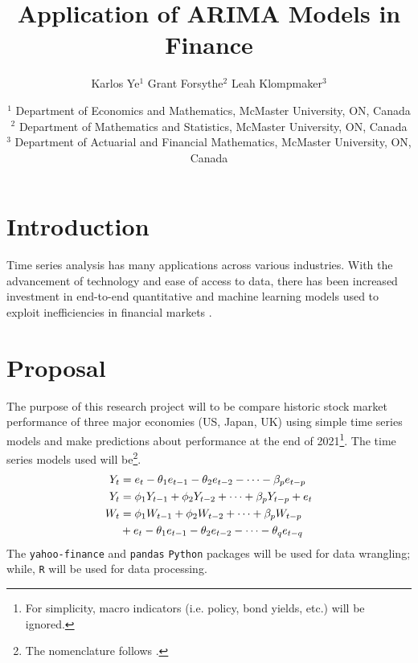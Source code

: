 \documentclass[12pt, centerh1]{article}
\title{Application of ARIMA Models in Finance}
\author{\qquad Karlos Ye$^{1}$ \qquad Grant Forsythe$^{2}$ \qquad Leah Klompmaker$^{3}$}
\date{
{\footnotesize $^1$ Department of Economics and Mathematics, McMaster University, ON, Canada\\[-6pt]
               $^2$ Department of Mathematics and Statistics, McMaster University, ON, Canada\\[-6pt]
               $^3$ Department of Actuarial and Financial Mathematics, McMaster University, ON, Canada\\[-6pt]}
}
\begin{document}
\clearpage\maketitle
\setcounter{page}{1}
\section{Introduction}
Time series analysis has many applications across various industries. With the advancement of technology and ease of access to data, there has been increased investment in end-to-end quantitative and machine learning models used to exploit inefficiencies in financial markets \citep{coqueret2021machine}. 
\section{Proposal}
The purpose of this research project will to be compare historic stock market performance of three major economies (US, Japan, UK) using simple time series models and make predictions about performance at the end of 2021\footnote{For simplicity, macro indicators (i.e. policy, bond yields, etc.) will be ignored.}. The time series models used will be\footnote{The nomenclature follows \citet{cryer2008time}.}.
\begin{align} 
\centering
    Y_t &= e_t - \theta_1e_{t-1} - \theta_2e_{t-2} - \cdots - \beta_pe_{t-p}\\
    Y_t &= \phi_1Y_{t-1} + \phi_2Y_{t-2} + \cdots + \beta_pY_{t-p} + e_t\\
    W_t &= \phi_1W_{t-1} + \phi_2W_{t-2} + \cdots + \beta_pW_{t-p}\\
        &+ e_t - \theta_1e_{t-1} - \theta_2e_{t-2} - \cdots - \theta_qe_{t-q}\nonumber
\end{align}
The \texttt{yahoo-finance} and \texttt{pandas} \texttt{Python} packages will be used for data wrangling; while, \texttt{R} will be used for data processing.

\newpage

\newpage

\nocite{*}


\end{document}
